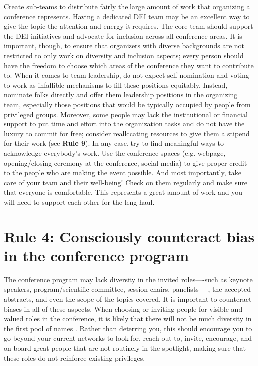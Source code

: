 \documentclass[10pt,letterpaper]{article}
\begin{document}
Create sub-teams to distribute fairly the large amount of work that organizing a conference represents. 
Having a dedicated DEI team may be an excellent way to give the topic the attention and energy it requires.
The core team should support the DEI initiatives and advocate for inclusion across all conference areas.
It is important, though, to ensure that organizers with diverse backgrounds are not restricted to only work on diversity and inclusion aspects; 
every person should have the freedom to choose which areas of the conference they want to contribute to.
When it comes to team leadership, do not expect self-nomination and voting to work as infallible mechanisms to fill these positions equitably. 
Instead, nominate folks directly and offer them leadership positions in the organizing team, especially those positions that would be typically occupied by people from privileged groups.
Moreover, some people may lack the institutional or financial support to put time and effort into the organization tasks and do not have the luxury to commit for free; consider reallocating resources to give them a stipend for their work (see \textbf{Rule 9}).
In any case, try to find meaningful ways to acknowledge everybody's work. Use the conference spaces (e.g. webpage, opening/closing ceremony at the conference, social media) to give proper credit to the people who are making the event possible.
And most importantly, take care of your team and their well-being! Check on them regularly and make sure that everyone is comfortable. This represents a great amount of work and you will need to support each other for the long haul.


\section*{Rule 4: Consciously counteract bias in the conference program}
\label{rule_unbias}

The conference program may lack diversity in the invited roles––-such as keynote speakers, program/scientific committee, session chairs, panelists––-, the accepted abstracts, and even the scope of the topics covered. 
It is important to counteract biases in all of these aspects.
When choosing or inviting people for visible and valued roles in the conference, it is likely that there will not be much diversity in the first pool of names \cite{dwyerNoticeWhoScience2021,swartzScienceValueDiversity2019,wongBuildDiversityScience2020,dignazioUnicornsJanitorsNinjas2020}. 
Rather than deterring you, this should encourage you to go beyond your current networks to look for, reach out to, invite, encourage, and on-board great people that are not routinely in the spotlight, making sure that these roles do not reinforce existing privileges.
\end{document}
